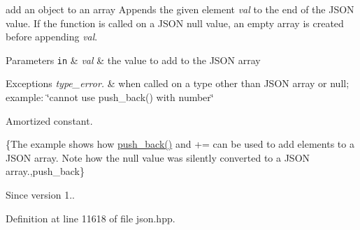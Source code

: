 add an object to an array Appends the given element {\itshape val} to the end of the J\+S\+ON value. If the function is called on a J\+S\+ON null value, an empty array is created before appending {\itshape val}.


\begin{DoxyParams}[1]{Parameters}
\mbox{\tt in}  & {\em val} & the value to add to the J\+S\+ON array\\
\hline
\end{DoxyParams}

\begin{DoxyExceptions}{Exceptions}
{\em type\+\_\+error.} & when called on a type other than J\+S\+ON array or null; example\+: {\ttfamily \char`\"{}cannot use push\+\_\+back() with number\char`\"{}}\\
\hline
\end{DoxyExceptions}
Amortized constant.

\{The example shows how {\ttfamily \hyperlink{classnlohmann_1_1basic__json_ac8e523ddc8c2dd7e5d2daf0d49a9c0d7}{push\+\_\+back()}} and {\ttfamily +=} can be used to add elements to a J\+S\+ON array. Note how the {\ttfamily null} value was silently converted to a J\+S\+ON array.,push\+\_\+back\}

\begin{DoxySince}{Since}
version 1.. 
\end{DoxySince}


Definition at line 11618 of file json.\+hpp.

